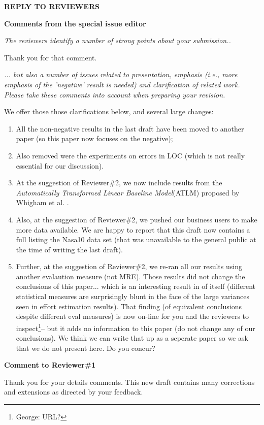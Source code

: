 \documentclass[smallcondesed]{svjour3}
\newcommand{\be}{\begin{enumerate}}
\newcommand{\ee}{\end{enumerate}}
\begin{document}
  
\newpage
\noindent
    {\bf REPLY TO REVIEWERS}

    \noindent
{\bf Comments from the special issue editor}

{\em     The reviewers identify a number of strong points about your submission..}

Thank you for that comment.

{\em ... but also a number of issues related to presentation, emphasis (i.e., more emphasis of the 'negative' result is needed) and clarification of related work. Please take these comments into account when preparing your revision.}

We offer those those clarifications below, and several large changes:

\be
\item All the non-negative results in the last draft have been moved to another paper
  (so this paper now focuses on the negative);
\item Also removed were the experiments on errors in LOC (which is
  not really essential for our discussion).
  
\item
  At the suggestion of Reviewer\#2, we now include results from the
  \textit{Automatically Transformed Linear Baseline Model}(ATLM) proposed by Whigham et al. \cite{whigham15}.
\item Also, at the suggestion of Reviewer\#2, we pushed our business users to make
  more data available. We are happy to report that this draft now contains a full listing the Nasa10
  data set (that was unavailable to the general public at the time of writing the last draft).
\item Further, at the suggestion of Reviewer\#2, we re-ran all our results
  using another evalaution measure (not MRE). Those results did not change
  the conclusions of this paper... which is an interesting result in of itself
  (different statistical measures are surprisingly blunt in the face
  of the large variances seen in effort estimation results). That finding (of
  equivalent conclusions despite different eval measures) is now on-line for
  you and the reviewers to inspect\footnote{George: URL?}-- but it adds no information to this
  paper (do not change any of our conclusions). We think we can write
  that up as a seperate paper so we ask that we do not
  present here.  Do you concur?
  \ee
  
\noindent
{\bf Comment to Reviewer\#1}

\noindent
Thank you for your details comments.  This new draft
contains many corrections and extensions as directed by your feedback.
\end{document}
